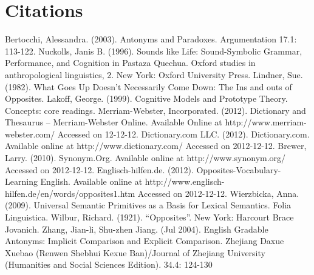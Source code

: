 \section {Citations}
Bertocchi, Alessandra. (2003). Antonyms and Paradoxes.  Argumentation 17.1: 113-122.
Nuckolls, Janis B. (1996). Sounds like Life: Sound-Symbolic Grammar, Performance, and Cognition in Pastaza 
Quechua. Oxford studies in anthropological linguistics, 2. New York: Oxford University Press.
Lindner, Sue. (1982). What Goes Up Doesn’t Necessarily Come Down: The Ins and outs of Opposites.  
Lakoff, George.  (1999). Cognitive Models and Prototype Theory. Concepts: core readings.  
Merriam-Webster, Incorporated. (2012). Dictionary and Thesaurus – Merriam-Webster Online.  Available Online at 
http://www.merriam-webster.com/ Accessed on 12-12-12.
Dictionary.com LLC.  (2012). Dictionary.com.  Available online at http://www.dictionary.com/ Accessed on 
2012-12-12.
Brewer, Larry. (2010). Synonym.Org. Available online at http://www.synonym.org/ Accessed on 2012-12-12.
Englisch-hilfen.de. (2012). Opposites-Vocabulary-Learning English. Available online at 
http://www.englisch-hilfen.de/en/words/opposites1.htm Accessed on 2012-12-12.
Wierzbicka, Anna. (2009). Universal Semantic Primitives as a Basis for Lexical Semantics.  Folia Linguistica.  
Wilbur, Richard. (1921). “Opposites”.  New York: Harcourt Brace Jovanich. 
Zhang, Jian-li, Shu-zhen Jiang. (Jul 2004). English Gradable Antonyms: Implicit Comparison and Explicit 
Comparison. Zhejiang Daxue Xuebao (Renwen Shebhui Kexue Ban)/Journal of   Zhejiang University 
(Humanities and Social Sciences Edition). 34.4: 124-130
